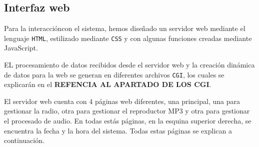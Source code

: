 \subsection{Interfaz web}
Para la interaccióncon el sistema, hemos diseñado un servidor web mediante el lenguaje \texttt{HTML}, estilizado mediante \texttt{CSS} y con algunas funciones creadas mediante JavaScript.

EL procesamiento de datos recibidos desde el servidor web y la creación dinámica de datos para la web se generan en diferentes archivos \texttt{CGI}, los cuales se explicarán en el \textbf{REFENCIA AL APARTADO DE LOS CGI}.

El servidor web cuenta con 4 páginas web diferentes, una principal, una para gestionar la radio, otra para gestionar el reproductor MP3 y otra para gestionar el procesado de audio. En todas estás páginas, en la esquina superior derecha, se encuentra la fecha y la hora del sistema. Todas estas páginas se explican a continuación.